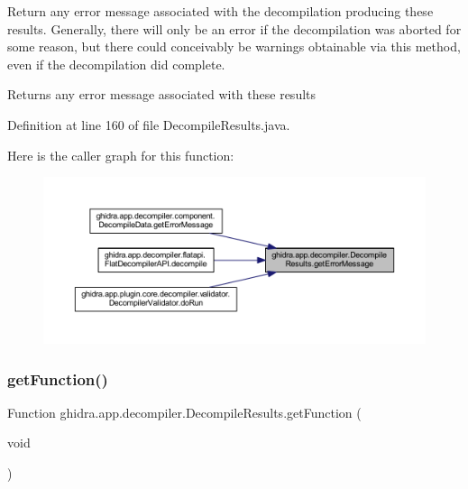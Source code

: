 Return any error message associated with the decompilation producing these results. Generally, there will only be an error if the decompilation was aborted for some reason, but there could conceivably be warnings obtainable via this method, even if the decompilation did complete. \begin{DoxyReturn}{Returns}
any error message associated with these results 
\end{DoxyReturn}


Definition at line 160 of file Decompile\+Results.\+java.

Here is the caller graph for this function\+:
\nopagebreak
\begin{figure}[H]
\begin{center}
\leavevmode
\includegraphics[width=350pt]{classghidra_1_1app_1_1decompiler_1_1_decompile_results_a239fb0781f15435446ab8b3b11abc079_icgraph}
\end{center}
\end{figure}
\mbox{\label{classghidra_1_1app_1_1decompiler_1_1_decompile_results_ae0f744db17c1404de98c893d27d30095}} 
\subsubsection{\texorpdfstring{getFunction()}{getFunction()}}
{\footnotesize\ttfamily Function ghidra.\+app.\+decompiler.\+Decompile\+Results.\+get\+Function (\begin{DoxyParamCaption}\item[{void}]{ }\end{DoxyParamCaption})\hspace{0.3cm}{\ttfamily [inline]}}



